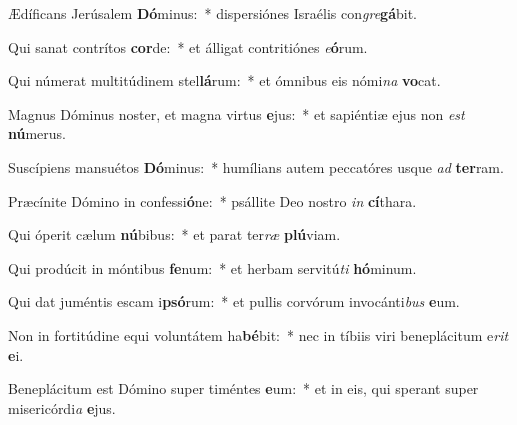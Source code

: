 \item Ædíficans Jerúsalem \textbf{Dó}minus:~* dispersiónes Israélis con\textit{gre}\textbf{gá}bit.
\item Qui sanat contrítos \textbf{cor}de:~* et álligat contritiónes \textit{e}\textbf{ó}rum.
\item Qui númerat multitúdinem stel\textbf{lá}rum:~* et ómnibus eis nómi\textit{na} \textbf{vo}cat.
\item Magnus Dóminus noster, et magna virtus \textbf{e}jus:~* et sapiéntiæ ejus non \textit{est} \textbf{nú}merus.
\item Suscípiens mansuétos \textbf{Dó}minus:~* humílians autem peccatóres usque \textit{ad} \textbf{ter}ram.
\item Præcínite Dómino in confessi\textbf{ó}ne:~* psállite Deo nostro \textit{in} \textbf{cí}thara.
\item Qui óperit cælum \textbf{nú}bibus:~* et parat ter\textit{ræ} \textbf{plú}viam.
\item Qui prodúcit in móntibus \textbf{fe}num:~* et herbam servitú\tinyhspace\textit{ti} \textbf{hó}minum.
\item Qui dat juméntis escam i\textbf{psó}rum:~* et pullis corvórum invocánti\textit{bus} \textbf{e}um.
\item Non in fortitúdine equi voluntátem ha\textbf{bé}bit:~* nec in tíbiis viri beneplácitum e\tinyhspace\textit{rit} \textbf{e}i.
\item Beneplácitum est Dómino super timéntes \textbf{e}um:~* et in eis, qui sperant super misericórdi\spurhspace\textit{a} \textbf{e}jus.
